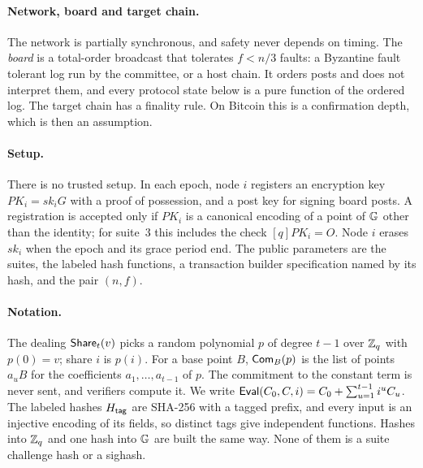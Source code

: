 \paragraph{Network, board and target chain.} The network is partially synchronous, and safety never depends on timing. The \emph{board} is a total-order broadcast that tolerates $f < n/3$ faults: a Byzantine fault tolerant log run by the committee, or a host chain. It orders posts and does not interpret them, and every protocol state below is a pure function of the ordered log. The target chain has a finality rule. On Bitcoin this is a confirmation depth, which is then an assumption.

\paragraph{Setup.} There is no trusted setup. In each epoch, node $i$ registers an encryption key $PK_i = sk_i G$ with a proof of possession, and a post key for signing board posts. A registration is accepted only if $PK_i$ is a canonical encoding of a point of $\mathbb{G}$ other than the identity; for suite~3 this includes the check $[q]PK_i = O$. Node $i$ erases $sk_i$ when the epoch and its grace period end. The public parameters are the suites, the labeled hash functions, a transaction builder specification named by its hash, and the pair $(n,f)$.

\paragraph{Notation.} The dealing $\mathsf{Share}_t(v)$ picks a random polynomial $p$ of degree $t-1$ over $\mathbb{Z}_q$ with $p(0) = v$; share $i$ is $p(i)$. For a base point $B$, $\mathsf{Com}_B(p)$ is the list of points $a_u B$ for the coefficients $a_1,\dots,a_{t-1}$ of $p$. The commitment to the constant term is never sent, and verifiers compute it. We write $\mathsf{Eval}(C_0, C, i) = C_0 + \sum_{u=1}^{t-1} i^u C_u$. The labeled hashes $H_{\mathsf{tag}}$ are SHA-256 with a tagged prefix, and every input is an injective encoding of its fields, so distinct tags give independent functions. Hashes into $\mathbb{Z}_q$ and one hash into $\mathbb{G}$ are built the same way. None of them is a suite challenge hash or a sighash.
